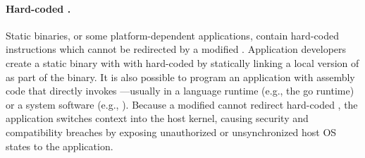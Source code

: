 \paragraph{Hard-coded \linuxapis{}.}
Static binaries, or some platform-dependent applications, contain hard-coded  instructions
which cannot be redirected by a modified \libc{}.
Application developers
create a static binary with with hard-coded \linuxapis{} by statically linking a local version of \libc{} as part of the binary.
It is also possible to program an application
with assembly code that directly invokes \linuxapis{}---usually in a language runtime (e.g., the go runtime) or a system software (e.g., ).
Because a modified \libc{} cannot redirect hard-coded \linuxapis{},
the application switches context into the host kernel,
causing security and compatibility breaches by exposing unauthorized or unsynchronized host OS states to the application.



